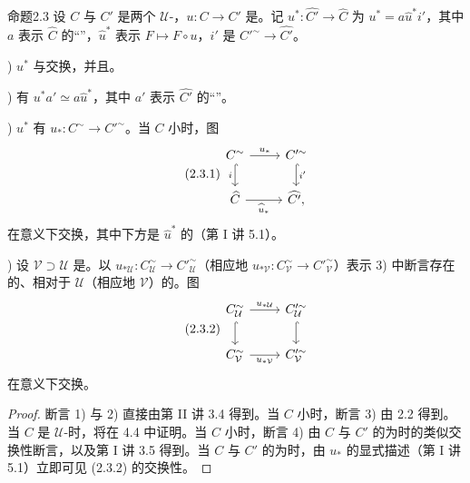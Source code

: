 \begin{SGAresult}{命题}{2.3}
设 $C$ 与 $C'$ 是两个 $\mathcal U$-，$u:C\to C'$ 是。记 $u^*:\widehat {C'}\to\widehat C$ 为 $u^*=a\widehat u^*i'$，其中 $a$ 表示 $\widehat C$ 的“”，$\widehat u^*$ 表示 $F\mapsto F\circ u$，$i'$ 是 $C'^{\sim}\to\widehat {C'}$。

)  $u^*$ 与交换，并且。

) 有 $u^*a'\simeq a\widehat u^*$，其中 $a'$ 表示 $\widehat {C'}$ 的“”。

)  $u^*$ 有 $u_*:C^{\sim}\to C'^{\sim}$。当 $C$ 小时，图
\begin{equation}\tag{2.3.1}
\begin{tikzcd}
 C^{\sim}\arrow[r,"u_*"]\arrow[d,hook,"i"']&C'^{\sim}\arrow[d,hook,"i'"]\\
 \widehat C\arrow[r,"\widehat u_*"']&\widehat {C'},
\end{tikzcd}
\end{equation}
在意义下交换，其中下方是 $\widehat u^*$ 的（第 I 讲 5.1）。

) 设 $\mathcal V\supset\mathcal U$ 是。以 $u_{*\mathcal U}:C^{\sim}_{\mathcal U}\to C'^{\sim}_{\mathcal U}$（相应地 $u_{*\mathcal V}:C^{\sim}_{\mathcal V}\to C'^{\sim}_{\mathcal V}$）表示 3) 中断言存在的、相对于 $\mathcal U$（相应地 $\mathcal V$）的。图
\begin{equation}\tag{2.3.2}
\begin{tikzcd}
 C^{\sim}_{\mathcal U}\arrow[r,"u_{*\mathcal U}"]\arrow[d,hook]&C'^{\sim}_{\mathcal U}\arrow[d,hook]\\
 C^{\sim}_{\mathcal V}\arrow[r,"u_{*\mathcal V}"']&C'^{\sim}_{\mathcal V}
\end{tikzcd}
\end{equation}
在意义下交换。
\end{SGAresult}
\begin{proof}
断言 1) 与 2) 直接由第 II 讲 3.4 得到。当 $C$ 小时，断言 3) 由 2.2 得到。当 $C$ 是 $\mathcal U$-时，将在 4.4 中证明。当 $C$ 小时，断言 4) 由 $C$ 与 $C'$ 的为时的类似交换性断言，以及第 I 讲 3.5 得到。当 $C$ 与 $C'$ 的为时，由 $u_*$ 的显式描述（第 I 讲 5.1）立即可见 (2.3.2) 的交换性。
\end{proof}

